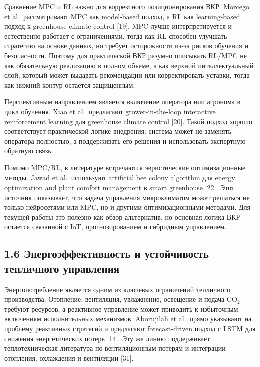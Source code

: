 \documentclass[a4paper,14pt]{extarticle}
\begin{document}
Сравнение MPC и RL важно для корректного позиционирования ВКР. Morcego
et al.~рассматривают MPC как model-based подход, а RL как learning-based
подход к greenhouse climate control {[}19{]}. MPC лучше интерпретируется
и естественно работает с ограничениями, тогда как RL способен улучшать
стратегию на основе данных, но требует осторожности из-за рисков
обучения и безопасности. Поэтому для практической ВКР разумно описывать
RL/MPC не как обязательную реализацию в полном объеме, а как верхний
интеллектуальный слой, который может выдавать рекомендации или
корректировать уставки, тогда как нижний контур остается защищенным.

Перспективным направлением является включение оператора или агронома в
цикл обучения. Xiao et al.~предлагают grower-in-the-loop interactive
reinforcement learning для greenhouse climate control {[}20{]}. Такой
подход хорошо соответствует практической логике внедрения: система может
не заменять оператора полностью, а поддерживать его решения и
использовать экспертную обратную связь.

Помимо MPC/RL, в литературе встречаются эвристические оптимизационные
методы. Jawad et al.~используют artificial bee colony algorithm для
energy optimization and plant comfort management в smart greenhouse
{[}22{]}. Этот источник показывает, что задача управления микроклиматом
может решаться не только нейросетями или MPC, но и другими
оптимизационными методами. Для текущей работы это полезно как обзор
альтернатив, но основная логика ВКР остается связанной с IoT,
прогнозированием и гибридным управлением.

\hypertarget{ux44dux43dux435ux440ux433ux43eux44dux444ux444ux435ux43aux442ux438ux432ux43dux43eux441ux442ux44c-ux438-ux443ux441ux442ux43eux439ux447ux438ux432ux43eux441ux442ux44c-ux442ux435ux43fux43bux438ux447ux43dux43eux433ux43e-ux443ux43fux440ux430ux432ux43bux435ux43dux438ux44f}{%
\subsection{1.6 Энергоэффективность и устойчивость тепличного
управления}\label{ux44dux43dux435ux440ux433ux43eux44dux444ux444ux435ux43aux442ux438ux432ux43dux43eux441ux442ux44c-ux438-ux443ux441ux442ux43eux439ux447ux438ux432ux43eux441ux442ux44c-ux442ux435ux43fux43bux438ux447ux43dux43eux433ux43e-ux443ux43fux440ux430ux432ux43bux435ux43dux438ux44f}}

Энергопотребление является одним из ключевых ограничений тепличного
производства. Отопление, вентиляция, увлажнение, освещение и подача
CO\(_2\) требуют ресурсов, а реактивное управление может приводить к
избыточным включениям исполнительных механизмов. Aborujilah et al.~прямо
указывают на проблему реактивных стратегий и предлагают forecast-driven
подход с LSTM для снижения энергетических потерь {[}14{]}. Эту же линию
поддерживает теплотехническая литература по вентиляционным потерям и
интеграции отопления, охлаждения и вентиляции {[}31{]}.
\end{document}
